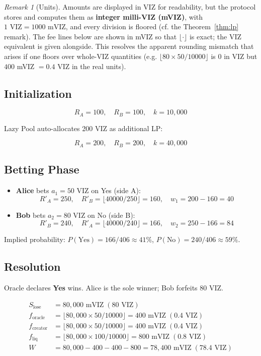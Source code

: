 \documentclass{ledger}
\theoremstyle{plain}
\theoremstyle{remark}
\newtheorem*{remark}{Remark}
\begin{document}
\begin{remark}[Units]
Amounts are displayed in VIZ for readability, but the protocol stores and
computes them as \textbf{integer milli-VIZ (mVIZ)}, with $1\text{ VIZ} =
1000\text{ mVIZ}$, and every division is floored (cf. the
Theorem~\ref{thm:lp} remark). The fee lines below are shown in mVIZ so that
$\lfloor\cdot\rfloor$ is exact; the VIZ equivalent is given alongside. This
resolves the apparent rounding mismatch that arises if one floors over
whole-VIZ quantities (e.g. $\lfloor 80\times 50/10000\rfloor$ is $0$ in VIZ but
$400$ mVIZ $=0.4$ VIZ in the real units).
\end{remark}

\subsection{Initialization}

\[
R_A = 100, \quad R_B = 100, \quad k = 10{,}000
\]

Lazy Pool auto-allocates 200 VIZ as additional LP:

\[
R_A = 200, \quad R_B = 200, \quad k = 40{,}000
\]

\subsection{Betting Phase}

\begin{itemize}
  \item \textbf{Alice} bets $a_1 = 50$ VIZ on Yes (side A):
  \[
  R'_A = 250, \quad R'_B = \lfloor 40000/250 \rfloor = 160, \quad w_1 = 200 -
  160 = 40
  \]
  \item \textbf{Bob} bets $a_2 = 80$ VIZ on No (side B):
  \[
  R'_B = 240, \quad R'_A = \lfloor 40000/240 \rfloor = 166, \quad w_2 = 250 -
  166 = 84
  \]
\end{itemize}

Implied probability: $P(\text{Yes}) = 166 / 406 \approx 41\%$, $P(\text{No}) =
240 / 406 \approx 59\%$.

\subsection{Resolution}

Oracle declares \textbf{Yes} wins. Alice is the sole winner; Bob forfeits 80
VIZ.

\begin{align*}
S_{\text{lose}} &= 80{,}000 \text{ mVIZ} \;(80 \text{ VIZ}) \\
f_{\text{oracle}} &= \lfloor 80{,}000 \times 50 / 10000 \rfloor = 400 \text{ mVIZ} \;(0.4 \text{ VIZ}) \\
f_{\text{creator}} &= \lfloor 80{,}000 \times 50 / 10000 \rfloor = 400 \text{ mVIZ} \;(0.4 \text{ VIZ}) \\
f_{\text{liq}} &= \lfloor 80{,}000 \times 100 / 10000 \rfloor = 800 \text{ mVIZ} \;(0.8 \text{ VIZ}) \\
W &= 80{,}000 - 400 - 400 - 800 = 78{,}400 \text{ mVIZ} \;(78.4 \text{ VIZ})
\end{align*}
\end{document}
